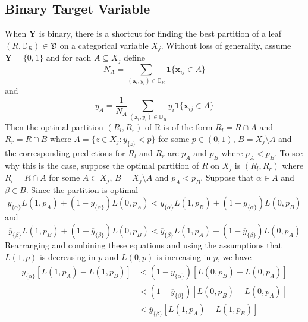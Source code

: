 \documentclass[11pt]{article}
\begin{document}
\subsection{Binary Target Variable}
When $\mathbf{Y}$ is binary, there is a shortcut for finding the best partition of a leaf $\left( R , \mathbb{D}_R \right) \in \mathfrak{D}$ on a categorical variable $X_j$. Without loss of generality, assume $\mathbf{Y} = \{ 0 , 1 \}$ and for each $A \subseteq X_j$ define
\begin{equation}
N_A = \sum_{\left( \mathbf{x}_i, y_i \right) \in \mathbb{D}_R} \mathbf{1} \{ \mathbf{x}_{ij} \in A \}
\end{equation}
and
\begin{equation}
\overline{y}_A = \frac{1}{N_A} \sum_{\left( \mathbf{x}_i, y_i \right) \in \mathbb{D}_R} y_i \mathbf{1} \{ \mathbf{x}_{ij} \in A \}
\end{equation}
Then the optimal partition $\left( R_l , R_r \right)$ of R is of the form $R_l = R \cap A$ and $R_r = R \cap B$ where $A = \{ z \in X_j : \overline{y}_{\{z\}} < p \}$ for some $p \in \left( 0 , 1 \right)$, $B = X_j \setminus A$ and the corresponding predictions for $R_l$ and $R_r$ are $p_A$ and $p_B$ where $p_A < p_B$. To see why this is the case, suppose the optimal partition of $R$ on $X_j$ is $\left( R_l , R_r \right)$ where $R_l = R \cap A$ for some $A \subset X_j$, $B = X_j \setminus A$ and $p_A < p_B$. Suppose that $\alpha \in A$ and $\beta \in B$. Since the partition is optimal
\begin{equation}
\overline{y}_{\{\alpha\}} L \left( 1 , p_A \right) + \left( 1 - \overline{y}_{\{\alpha\}} \right) L \left( 0 , p_A \right) <
\overline{y}_{\{\alpha\}} L \left( 1 , p_B \right) + \left( 1 - \overline{y}_{\{\alpha\}} \right) L \left( 0 , p_B \right)
\end{equation}
and
\begin{equation}
\overline{y}_{\{\beta\}} L \left( 1 , p_B \right) + \left( 1 - \overline{y}_{\{\beta\}} \right) L \left( 0 , p_B \right) <
\overline{y}_{\{\beta\}} L \left( 1 , p_A \right) + \left( 1 - \overline{y}_{\{\beta\}} \right) L \left( 0 , p_A \right)
\end{equation}
Rearranging and combining these equations and using the assumptions that $L \left( 1 , p \right)$ is decreasing in $p$ and $L \left( 0 , p \right)$ is increasing in $p$, we have
\begin{equation}
\begin{split}
\overline{y}_{\{\alpha\}} \left[ L \left( 1, p_A \right) - L \left( 1, p_B \right) \right] & < \left( 1 - \overline{y}_{\{\alpha\}} \right) \left[ L \left( 0, p_B \right) - L \left( 0, p_A \right) \right] \\
& < \left( 1 - \overline{y}_{\{\beta\}} \right) \left[ L \left( 0, p_B \right) - L \left( 0, p_A \right) \right] \\
& < \overline{y}_{\{\beta\}} \left[ L \left( 1, p_A \right) - L \left( 1, p_B \right) \right]
\end{split}
\end{equation}
\end{document}
